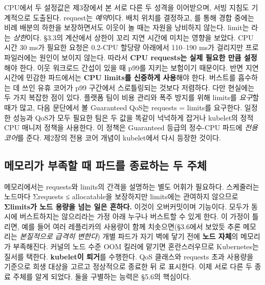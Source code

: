 CPU에서 두 설정값은 제3장에서 본 서로 다른 두 성격을 이어받으며, 서빙 지침도 기계적으로 도출된다. request는 \textit{예약}이다. 배치 위치를 결정하고, 를 통해 경합 중에는 비례 배분의 하한을 보장하면서도 이웃이 놀 때는 자원을 낭비하지 않는다. limit는 라는 \textit{상한}이다. §3.3의 계산에서 상한이 꼬리 지연 시간에 미치는 영향을 보았다. CPU 시간 30 ms가 필요한 요청은 0.2-CPU 할당량 아래에서 110–190 ms가 걸리지만 프로파일러에는 원인이 보이지 않는다. 따라서 \textbf{CPU requests는 실제 필요한 만큼 설정}해야 한다. 이웃 워크로드 간섭이 있을 때 p99를 지키는 보험이기 때문이다. 반면 지연 시간에 민감한 파드에서는 \textbf{CPU limits를 신중하게 사용}해야 한다. 버스트를 흡수하는 데 쓰인 유휴 코어가 p99 구간에서 스로틀링되는 것보다 저렴하다. 다만 현실에는 두 가지 복잡한 점이 있다. 플랫폼 팀이 비용 관리와 폭주 방지를 위해 limits를 \textit{요구}할 때가 많고, 다음 문단에서 볼 Guaranteed QoS는 requests = limits를 요구한다. 일정한 성능과 QoS가 모두 필요한 팀은 두 값을 똑같이 넉넉하게 잡거나 kubelet의 정적 CPU 매니저 정책을 사용한다. 이 정책은 Guaranteed 등급의 정수-CPU 파드에 \textit{전용 코어}를 준다. 제2장의 전용 코어 개념이 kubelet에서 다시 등장한 것이다.

\subsection*{메모리가 부족할 때 파드를 종료하는 두 주체}

메모리에서는 requests와 limits의 간격을 설명하는 별도 어휘가 필요하다. 스케줄러는 노드마다 Σrequests ≤ allocatable을 보장하지만 limits에는 관여하지 않으므로 \textbf{Σlimits가 노드 용량을 넘는 일은 흔하다.} 이것이 오버커밋이며 기능이다. 모두가 동시에 버스트하지는 않으리라는 가정 아래 누구나 버스트할 수 있게 한다. 이 가정이 틀리면, 예를 들어 여러 레플리카의 사용량이 함께 치솟으면(§3.6에서 보았듯 추론 메모리는 \textit{본질적으로 급격히 변한다}) 개별 파드가 자기 벽에 닿기 전에 \textbf{노드 자체}의 메모리가 부족해진다. 커널의 노드 수준 OOM 킬러에 맡기면 혼란스러우므로 Kubernetes는 질서를 택한다. \textbf{kubelet이 퇴거}를 수행한다. QoS 클래스와 requests 초과 사용량을 기준으로 희생 대상을 고르고 정상적으로 종료한 뒤 로 표시한다. 이제 서로 다른 두 종료 주체를 알게 되었다. 둘을 구별하는 능력은 §5.6의 핵심이다.

